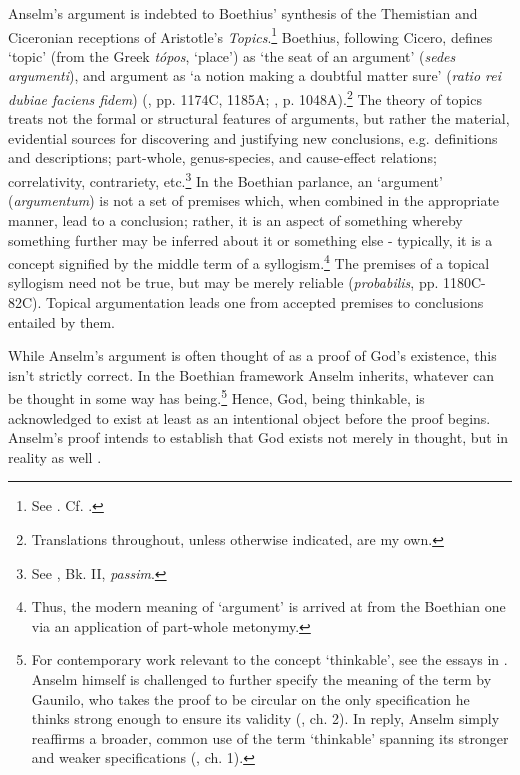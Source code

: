 \documentclass[]{birkjour}
\begin{document}
Anselm's argument is indebted to Boethius' synthesis of the Themistian and Ciceronian receptions of Aristotle's \textit{Topics}.\footnote{See \cite{Archambault2017,Holopainen2007}. Cf. \cite{Cerezo2015,Henry1974}.} Boethius, following Cicero, defines `topic' (from the Greek \textit{t\'{o}pos},  `place') as `the seat of an argument' (\textit{sedes argumenti}), and argument as `a notion making a doubtful matter sure' (\textit{ratio rei dubiae faciens fidem}) (\cite{BDT}, pp. 1174C, 1185A; \cite{BTC}, p. 1048A).\footnote{Translations throughout, unless otherwise indicated, are my own.} The theory of topics treats not the formal or structural features of arguments, but rather the material, evidential sources for discovering and justifying new conclusions, e.g. definitions and descriptions; part-whole, genus-species, and cause-effect relations; correlativity, contrariety, etc.\footnote{See \cite{BDT}, Bk. II, \textit{passim}.} In the Boethian parlance, an `argument' (\textit{argumentum}) is not a set of premises which, when combined in the appropriate manner, lead to a conclusion; rather, it is an aspect of something whereby something further may be inferred about it or something else - typically, it is a concept signified by the middle term of a syllogism.\footnote{Thus, the modern meaning of `argument' is arrived at from the Boethian one via an application of part-whole metonymy.} The premises of a topical syllogism need not be true, but may be merely reliable (\textit{probabilis}, \cite{BDT} pp. 1180C-82C). Topical argumentation leads one from accepted premises to conclusions entailed by them. 
	
While Anselm's argument is often thought of as a proof of God's existence, this isn't strictly correct. In the Boethian framework Anselm inherits, whatever can be thought in some way has being.\footnote{For contemporary work relevant to the concept `thinkable', see the essays in \cite{Gendler2002}. Anselm himself is challenged to further specify the meaning of the term by Gaunilo, who takes the proof to be circular on the only specification he thinks strong enough to ensure its validity (\cite{ProIns}, ch. 2). In reply, Anselm simply reaffirms a broader, common use of the term `thinkable' spanning its stronger and weaker specifications (\cite{AnselmResp}, ch. 1).} Hence, God, being thinkable, is acknowledged to exist at least as an intentional object before the proof begins. Anselm's proof intends to establish that God exists not merely in thought, but in reality as well \cite{Klima2000}.
	
\end{document}
